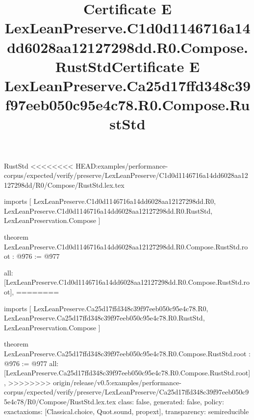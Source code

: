 \begin{lexlean}{RustStd}
<<<<<<<< HEAD:examples/performance-corpus/expected/verify/preserve/LexLeanPreserve/C1d0d1146716a14dd6028aa12127298dd/R0/Compose/RustStd.lex.tex
\title{Certificate E LexLeanPreserve.C1d0d1146716a14dd6028aa12127298dd.R0.Compose.RustStd}
\begin{coremodule}
imports [
  LexLeanPreserve.C1d0d1146716a14dd6028aa12127298dd.R0,
  LexLeanPreserve.C1d0d1146716a14dd6028aa12127298dd.R0.RustStd,
  LexLeanPreservation.Compose
]

theorem LexLeanPreserve.C1d0d1146716a14dd6028aa12127298dd.R0.Compose.RustStd.root : @976 := @977 {
  all: [LexLeanPreserve.C1d0d1146716a14dd6028aa12127298dd.R0.Compose.RustStd.root],
========
\title{Certificate E LexLeanPreserve.Ca25d17ffd348c39f97eeb050c95e4c78.R0.Compose.RustStd}
\begin{coremodule}
imports [
  LexLeanPreserve.Ca25d17ffd348c39f97eeb050c95e4c78.R0,
  LexLeanPreserve.Ca25d17ffd348c39f97eeb050c95e4c78.R0.RustStd,
  LexLeanPreservation.Compose
]

theorem LexLeanPreserve.Ca25d17ffd348c39f97eeb050c95e4c78.R0.Compose.RustStd.root : @976 := @977 {
  all: [LexLeanPreserve.Ca25d17ffd348c39f97eeb050c95e4c78.R0.Compose.RustStd.root],
>>>>>>>> origin/release/v0.5:examples/performance-corpus/expected/verify/preserve/LexLeanPreserve/Ca25d17ffd348c39f97eeb050c95e4c78/R0/Compose/RustStd.lex.tex
  class: false,
  generated: false,
  policy: exact{axioms: [Classical.choice, Quot.sound, propext]},
  transparency: semireducible
}


\end{coremodule}}
\end{coremodule}
\end{lexlean}
